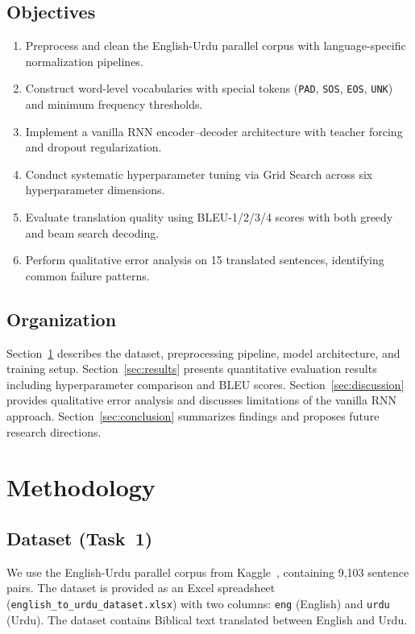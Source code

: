 \documentclass[runningheads]{llncs}
\begin{document}
\subsection{Objectives}
\begin{enumerate}
    \item Preprocess and clean the English-Urdu parallel corpus with language-specific normalization pipelines.
    \item Construct word-level vocabularies with special tokens (\texttt{PAD}, \texttt{SOS}, \texttt{EOS}, \texttt{UNK}) and minimum frequency thresholds.
    \item Implement a vanilla RNN encoder--decoder architecture with teacher forcing and dropout regularization.
    \item Conduct systematic hyperparameter tuning via Grid Search across six hyperparameter dimensions.
    \item Evaluate translation quality using BLEU-1/2/3/4 scores with both greedy and beam search decoding.
    \item Perform qualitative error analysis on 15 translated sentences, identifying common failure patterns.
\end{enumerate}

\subsection{Organization}
Section~\ref{sec:methodology} describes the dataset, preprocessing pipeline, model architecture, and training setup. Section~\ref{sec:results} presents quantitative evaluation results including hyperparameter comparison and BLEU scores. Section~\ref{sec:discussion} provides qualitative error analysis and discusses limitations of the vanilla RNN approach. Section~\ref{sec:conclusion} summarizes findings and proposes future research directions.

\section{Methodology}\label{sec:methodology}

\subsection{Dataset (Task~1)}

We use the English-Urdu parallel corpus from Kaggle~\cite{kaggle_dataset}, containing 9,103 sentence pairs. The dataset is provided as an Excel spreadsheet (\texttt{english\_to\_urdu\_dataset.xlsx}) with two columns: \texttt{eng} (English) and \texttt{urdu} (Urdu). The dataset contains Biblical text translated between English and Urdu.
\end{document}
